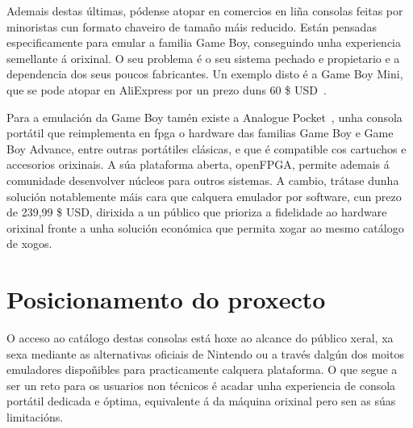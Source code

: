 Ademais destas últimas, pódense atopar en comercios en liña consolas feitas por minoristas
cun formato chaveiro de tamaño máis reducido. Están pensadas especificamente para emular a familia Game Boy,
conseguindo unha experiencia semellante á orixinal. O seu problema é o seu sistema pechado e propietario
e a dependencia dos seus poucos fabricantes.
Un exemplo disto é a Game Boy Mini, que se pode atopar en AliExpress por un prezo duns 60 \$ USD~\cite{gameboymini}.

Para a emulación da Game Boy tamén existe a Analogue Pocket~\cite{analoguepocket},
unha consola portátil que reimplementa en \acrshort{fpga} o hardware das familias
Game Boy e Game Boy Advance, entre outras portátiles clásicas,
e que é compatible cos cartuchos e accesorios orixinais.
A súa plataforma aberta, openFPGA, permite ademais á comunidade desenvolver
núcleos para outros sistemas.
A cambio, trátase dunha solución notablemente máis cara que calquera emulador por software,
cun prezo de 239,99 \$ USD,
dirixida a un público que prioriza a fidelidade ao hardware orixinal fronte a unha solución económica
que permita xogar ao mesmo catálogo de xogos.

\section{Posicionamento do proxecto}
\label{sec:posicionamento}
O acceso ao catálogo destas consolas está hoxe ao alcance do público xeral,
xa sexa mediante as alternativas oficiais de Nintendo ou a través dalgún dos moitos
emuladores dispoñibles para practicamente calquera plataforma.
O que segue a ser un reto para os usuarios non técnicos é acadar
unha experiencia de consola portátil dedicada e óptima,
equivalente á da máquina orixinal pero sen as súas limitacións.

